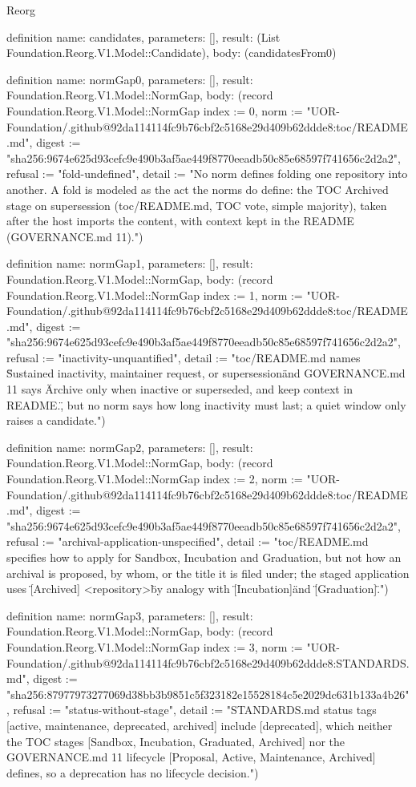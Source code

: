 \begin{lexlean}{Reorg}
\begin{semanticmodule}
definition{
  name: candidates,
  parameters: [],
  result: (List Foundation.Reorg.V1.Model::Candidate),
  body: (candidatesFrom0)
}

definition{
  name: normGap0,
  parameters: [],
  result: Foundation.Reorg.V1.Model::NormGap,
  body: (record Foundation.Reorg.V1.Model::NormGap {index := 0, norm := "UOR-Foundation/.github@92da114114fc9b76cbf2c5168e29d409b62ddde8:toc/README.md", digest := "sha256:9674e625d93cefc9e490b3af5ae449f8770eeadb50c85e68597f741656c2d2a2", refusal := "fold-undefined", detail := "No norm defines folding one repository into another. A fold is modeled as the act the norms do define: the TOC Archived stage on supersession (toc/README.md, TOC vote, simple majority), taken after the host imports the content, with context kept in the README (GOVERNANCE.md 11)."})
}

definition{
  name: normGap1,
  parameters: [],
  result: Foundation.Reorg.V1.Model::NormGap,
  body: (record Foundation.Reorg.V1.Model::NormGap {index := 1, norm := "UOR-Foundation/.github@92da114114fc9b76cbf2c5168e29d409b62ddde8:toc/README.md", digest := "sha256:9674e625d93cefc9e490b3af5ae449f8770eeadb50c85e68597f741656c2d2a2", refusal := "inactivity-unquantified", detail := "toc/README.md names \"Sustained inactivity, maintainer request, or supersession\" and GOVERNANCE.md 11 says \"Archive only when inactive or superseded, and keep context in README.\", but no norm says how long inactivity must last; a quiet window only raises a candidate."})
}

definition{
  name: normGap2,
  parameters: [],
  result: Foundation.Reorg.V1.Model::NormGap,
  body: (record Foundation.Reorg.V1.Model::NormGap {index := 2, norm := "UOR-Foundation/.github@92da114114fc9b76cbf2c5168e29d409b62ddde8:toc/README.md", digest := "sha256:9674e625d93cefc9e490b3af5ae449f8770eeadb50c85e68597f741656c2d2a2", refusal := "archival-application-unspecified", detail := "toc/README.md specifies how to apply for Sandbox, Incubation and Graduation, but not how an archival is proposed, by whom, or the title it is filed under; the staged application uses \"[Archived] <repository>\" by analogy with \"[Incubation]\" and \"[Graduation]\"."})
}

definition{
  name: normGap3,
  parameters: [],
  result: Foundation.Reorg.V1.Model::NormGap,
  body: (record Foundation.Reorg.V1.Model::NormGap {index := 3, norm := "UOR-Foundation/.github@92da114114fc9b76cbf2c5168e29d409b62ddde8:STANDARDS.md", digest := "sha256:87977973277069d38bb3b9851c5f323182e15528184c5e2029dc631b133a4b26", refusal := "status-without-stage", detail := "STANDARDS.md status tags [active, maintenance, deprecated, archived] include [deprecated], which neither the TOC stages [Sandbox, Incubation, Graduated, Archived] nor the GOVERNANCE.md 11 lifecycle [Proposal, Active, Maintenance, Archived] defines, so a deprecation has no lifecycle decision."})
}


\end{semanticmodule}
\end{lexlean}
